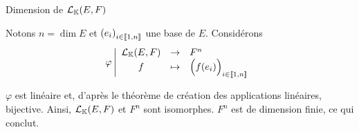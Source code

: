 \documentclass{article}
\begin{document}
\begin{question_kholle}
	[$\mathcal{L}_\K(E,F)$ est dimension finie et
		\begin{equation}
			\dim \mathcal{L}_\K(E,F) = \dim E \times \dim F
		\end{equation}]
	{Dimension de $\mathcal{L}_\K(E,F)$}

	Notons $n = \dim E$ et $\left(e_i\right)_{i \in [\![ 1 , n ]\!]}$ une base de $E$. Considérons
	\begin{equation*}
		\varphi
		\left| \begin{array}{ccl}
			\mathcal{L}_{\mathbb K}(E,F) & \to     & F^n                                            \\
			f                   & \mapsto & \Big( f(e_i) \Big)_{i \in [\![ 1 , n ]\!]}
		\end{array} \right.
	\end{equation*}

	$\varphi$ est linéaire et, d'après le théorème de création des applications linéaires, bijective.
	Ainsi, $\mathcal{L}_\K(E,F)$ et $F^n$ sont isomorphes. $F^n$ est de dimension finie, ce qui conclut.
\end{question_kholle}
\end{document}
